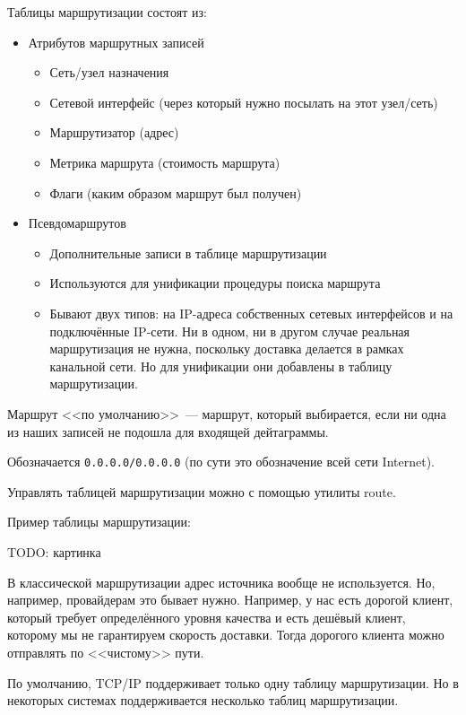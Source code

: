 Таблицы маршрутизации состоят из:
\begin{itemize}
    \item Атрибутов маршрутных записей
    \begin{itemize}
        \item Сеть/узел назначения
        \item Сетевой интерфейс (через который нужно посылать на этот узел/сеть)
        \item Маршрутизатор (адрес)
        \item Метрика маршрута (стоимость маршрута)
        \item Флаги (каким образом маршрут был получен)
    \end{itemize}
    \item Псевдомаршрутов
    \begin{itemize}
        \item Дополнительные записи в таблице маршрутизации
        \item Используются для унификации процедуры поиска маршрута
        \item Бывают двух типов: на IP-адреса собственных сетевых интерфейсов и на подключённые IP-сети. Ни в одном, ни в другом случае реальная маршрутизация не нужна, поскольку доставка делается в рамках канальной сети. Но для унификации они добавлены в таблицу маршрутизации.
    \end{itemize}
\end{itemize}

Маршрут <<по умолчанию>>~--- маршрут, который выбирается, если ни одна из наших записей не подошла для входящей дейтаграммы.

Обозначается {\tt 0.0.0.0/0.0.0.0} (по сути это обозначение всей сети Internet). 

Управлять таблицей маршрутизации можно с помощью утилиты route.

Пример таблицы маршрутизации:

TODO: картинка

В классической маршрутизации адрес источника вообще не используется. Но, например, провайдерам это бывает нужно. Например, у нас есть дорогой клиент, который требует определённого уровня качества и есть дешёвый клиент, которому мы не гарантируем скорость доставки. Тогда дорогого клиента можно отправлять по <<чистому>> пути.

По умолчанию, TCP/IP поддерживает только одну таблицу маршрутизации. Но в некоторых системах поддерживается несколько таблиц маршрутизации.

